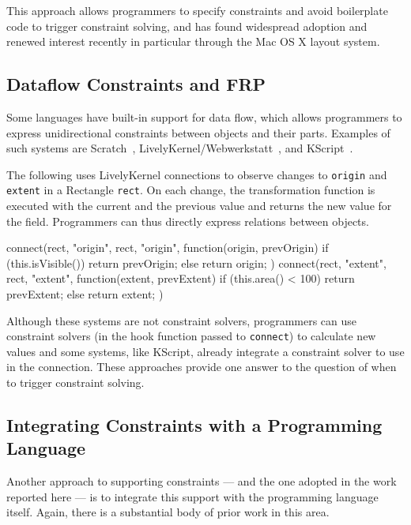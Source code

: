 This approach allows programmers to specify constraints and avoid
boilerplate code to trigger constraint solving, and has found
widespread adoption and renewed interest recently in particular
through the Mac OS X layout system.

\subsection{Dataflow Constraints and FRP}

Some languages have built-in support for data flow, which allows
programmers to express unidirectional constraints between objects and
their parts. Examples of such systems are
Scratch~\cite{resnick2009scratch},
LivelyKernel/Webwerkstatt~\cite{lincke2012lively}, and
KScript~\cite{ohshima2012report}.

The following uses LivelyKernel connections to observe changes to
\texttt{origin} and \texttt{extent} in a Rectangle \texttt{rect}.  On
each change, the transformation function is executed with the current
and the previous value and returns the new value for the
field. Programmers can thus directly express relations between
objects.
\begin{code}[language=java]
connect(rect, "origin", rect, "origin",
        function(origin, prevOrigin) {
            if (this.isVisible()) return prevOrigin;
            else return origin;
        })
connect(rect, "extent", rect, "extent",
        function(extent, prevExtent) {
            if (this.area() < 100) return prevExtent;
            else return extent;
        })
\end{code}

Although these systems are not constraint solvers, programmers can use
constraint solvers (in the hook function passed to
\lstinline{connect}) to calculate new values and some systems, like
KScript, already integrate a constraint solver to use in the
connection. These approaches provide one answer to the question of 
when to trigger constraint solving.

\subsection{Integrating Constraints with a Programming Language}

Another approach to supporting constraints --- and the one adopted in
the work reported here --- is to integrate this support with the
programming language itself.  Again, there is a substantial body of
prior work in this area.  

